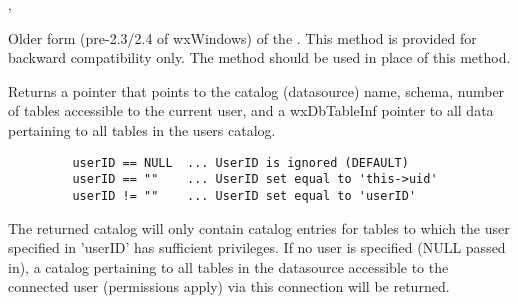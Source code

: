 
, 

\label{wxdbfwdonlycursors}


Older form (pre-2.3/2.4 of wxWindows) of the
.  This method is
provided for backward compatibility only.  The method
 should be
used in place of this method.



\label{wxdbgetcatalog}


Returns a  pointer that points to the catalog
(datasource) name, schema, number of tables accessible to the current user,
and a wxDbTableInf pointer to all data pertaining to all tables in the users
catalog.



\begin{verbatim}
         userID == NULL  ... UserID is ignored (DEFAULT)
         userID == ""    ... UserID set equal to 'this->uid'
         userID != ""    ... UserID set equal to 'userID'
\end{verbatim}


The returned catalog will only contain catalog entries for tables to which the user specified in 'userID' has sufficient privileges.  If no user is specified (NULL passed in), a catalog pertaining to all tables in the datasource accessible to the connected user (permissions apply) via this connection will be returned.

\label{wxdbgetcolumncount}



